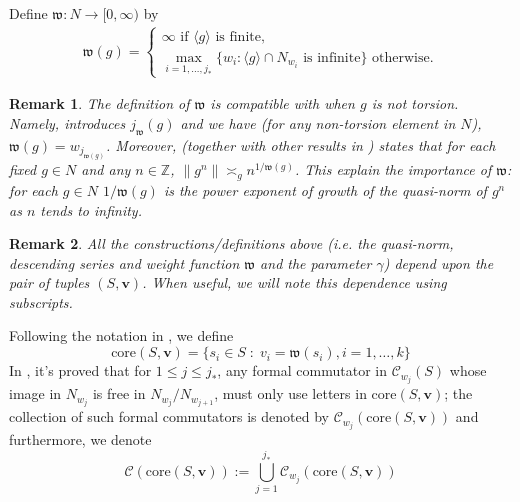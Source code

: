 \documentclass[pdflatex,sn-mathphys-num]{sn-jnl}%
\theoremstyle{thmstyleone}%
\theoremstyle{thmstyletwo}%
\newtheorem{rem}{Remark}%
\theoremstyle{thmstylethree}%
\begin{document}
Define $ \mathfrak{w}: N \to [0, \infty)$ by   
\begin{align*}
    \mathfrak{w}(g) =\left\{
    \begin{array}{l}
        \infty \text{ if } \langle g\rangle \text{ is finite},\\
        \underset{i=1,\ldots,j_*}{\max}\{w_i: \langle g\rangle \cap N_{w_i} \mbox{ is infinite}\} \text{ otherwise.}
    \end{array}\right.
\end{align*}


\begin{rem}
\label{rem: norm}
    The definition of $\mathfrak{w}$ is compatible with \cite[Def. 2.13 and Prop. 2.17]{SCZ-nil} when $g$ is not torsion. Namely, \cite[Definition 2.13]{SCZ-nil} introduces $j_{\mathfrak w}(g)$  and  we have (for any non-torsion element in $N$), $\mathfrak{w}(g)=w_{j_{\mathfrak{w}(g)}}$. Moreover, \cite[Proposition 2.17]{SCZ-nil} (together with other results in \cite{SCZ-nil}) states that for each fixed $g\in N$ and any $n\in \mathbb Z$, $\|g^n\|\asymp_g n^{1/\mathfrak{w}(g)}$. This explain the importance of $\mathfrak w$: for each $g\in N$ $1/\mathfrak w(g)$ is the power exponent of growth of the quasi-norm of $g^n$ as $n$ tends to infinity. 
\end{rem}

\begin{rem}
All the constructions/definitions above  (i.e. the quasi-norm, descending series and weight function $\mathfrak{w}$ and the parameter $\gamma$) depend upon the pair of tuples $(S,\mathbf v)$.  When useful, we will note this dependence using subscripts.
\end{rem}




Following the notation in \cite{SCZ-nil}, 
we define 
$$\mbox{core}(S,\mathbf{v}) = \{s_i \in S\;:\; v_i = \mathfrak{w}(s_i), i=1,\ldots, k\}$$
In \cite[Proposition 2.14]{SCZ-nil}, it's proved that for $1\le j \le j_*$, any formal commutator in $\mathcal{C}_{w_j}(S)$ whose image in $N_{w_j}$ is free in $N_{w_j}/N_{w_{j+1}}$,  must only use letters in $\mbox{core}(S,\mathbf{v})$; the collection of such formal commutators is denoted by 
$\mathcal{C}_{w_j}(\mbox{core}(S,\mathbf{v}))$ and furthermore, we denote
$$\mathcal{C}(\mbox{core}(S,\mathbf{v})) := \bigcup_{j=1}^{j_*}\mathcal{C}_{w_j}(\mbox{core}(S,\mathbf{v}))$$
\end{document}
